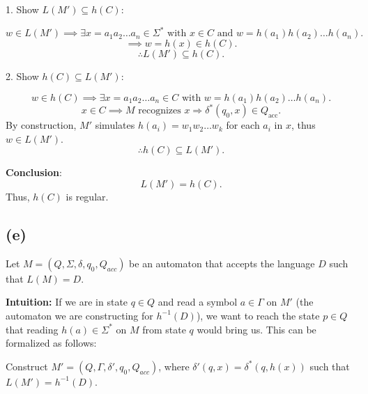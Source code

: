 




1. Show \( L(M') \subseteq h(C) \):

\[
w \in L(M') \implies \exists x = a_1a_2 \ldots a_n \in \Sigma^* \text{ with } x \in C \text{ and } w = h(a_1)h(a_2) \ldots h(a_n).
\]
\[
\implies w = h(x) \in h(C).
\]
\[
\therefore L(M') \subseteq h(C).
\]

2. Show \( h(C) \subseteq L(M') \):

\[
w \in h(C) \implies \exists x = a_1a_2 \ldots a_n \in C \text{ with } w = h(a_1)h(a_2) \ldots h(a_n).
\]
\[
x \in C \implies M \text{ recognizes } x \Rightarrow \delta^*(q_0, x) \in Q_{\text{acc}}.
\]
By construction, \( M' \) simulates \( h(a_i) = w_1w_2 \ldots w_k \) for each \( a_i \) in \( x \), thus \( w \in L(M') \).
\[
\therefore h(C) \subseteq L(M').
\]

\textbf{Conclusion}:
\[
L(M') = h(C).
\]
Thus, \( h(C) \) is regular.


\subsection{(e)}
Let \( M = (Q, \Sigma, \delta, q_0, Q_{acc}) \) be an automaton that accepts the language \( D \) such that \( L(M) = D \).

\textbf{Intuition:} If we are in state \( q \in Q \) and read a symbol \( a \in \Gamma \) on \( M' \) (the automaton we are constructing for \( h^{-1}(D) \)), we want to reach the state \( p \in Q \) that reading \( h(a) \in \Sigma^* \) on \( M \) from state \( q \) would bring us. This can be formalized as follows:

Construct \( M' = (Q, \Gamma, \delta', q_0, Q_{acc}) \), where \( \delta'(q, x) = \delta^*(q, h(x)) \) such that \( L(M') = h^{-1}(D) \).

